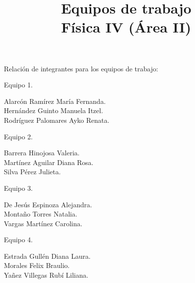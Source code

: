 \documentclass[14pt]{extarticle}
\title{\vspace*{-2cm} Equipos de trabajo \\  Física IV (Área II) \vspace{-5ex}}
\date{}
\begin{document}
\maketitle

Relación de integrantes para los equipos de trabajo:

\vspace*{1cm}
\noindent
\large{Equipo 1.}

\noindent
Alarcón Ramírez María Fernanda. \\
Hernández	Guinto Manuela Itzel. \\
Rodríguez	Palomares	Ayko Renata.

\vspace*{1cm}
\noindent
\large{Equipo 2.}

\noindent
Barrera Hinojosa Valeria. \\
Martínez Aguilar Diana Rosa. \\
Silva Pérez Julieta.

\vspace*{1cm}
\noindent
\large{Equipo 3.}

\noindent
De Jesús Espinoza Alejandra. \\
Montaño Torres Natalia. \\
Vargas Martínez Carolina.

\vspace*{1cm}
\noindent
\large{Equipo 4.}

\noindent
Estrada Gullén Diana Laura. \\
Morales Felix Braulio. \\
Yañez Villegas Rubí Liliana.
\end{document}
